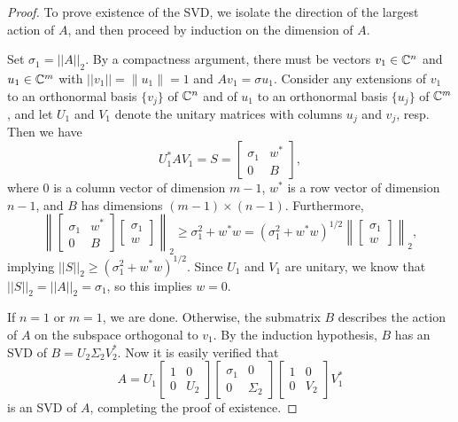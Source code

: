\begin{proof}
To prove existence of the SVD, we isolate the direction of the largest action of $A$, and then proceed by induction on the dimension of $A$.  

Set $\sigma_1=||A||_2$.  By a compactness argument, there must be vectors $v_1\in{\mathbb C}^n$ and $u_1\in{\mathbb C}^m$ with $||v_1||=\|u_1\|=1$ and $Av_1=\sigma u_1$.  Consider any extensions of $v_1$ to an orthonormal basis $\{v_j\}$  of ${\mathbb C}^n$ and of $u_1$ to an orthonormal basis $\{u_j\}$ of ${\mathbb C}^m$, and let $U_1$ and $V_1$ denote the unitary matrices with columns $u_j$ and $v_j$, resp.  Then we have 
\begin{equation}
U_1^*AV_1=S=\begin{bmatrix}
\sigma_1 & w^*\\
0 & B
\end{bmatrix},
\end{equation}
where 0 is a column vector of dimension $m-1$, $w^*$ is a row vector of dimension $n-1$, and $B$ has dimensions $(m-1)\times (n-1)$.  Furthermore, 
\[
\left\|\begin{bmatrix}
\sigma_1 & w^*\\
0 & B
\end{bmatrix}\begin{bmatrix}
\sigma_1\\
w
\end{bmatrix}\right\|_2 \geq \sigma_1^2+w^*w=(\sigma_1^2+w^*w)^{1/2}\left\|\begin{bmatrix}
\sigma_1\\
w
\end{bmatrix}\right\|_2,
\]
implying  $||S||_2\geq (\sigma_1^2+w^*w)^{1/2}.$  Since $U_1$ and $V_1$ are unitary, we know that $||S||_2=||A||_2=\sigma_1$, so this implies $w=0$.  

If $n=1$ or $m=1$, we are done.  Otherwise, the submatrix $B$ describes the action of $A$ on the subspace orthogonal to $v_1$.  By the induction hypothesis, $B$ has an SVD of $B=U_2\Sigma_2 V_2^*.$ Now it is easily verified that 
\[
A=U_1\begin{bmatrix}
1 & 0 \\ 0 & U_2
\end{bmatrix}\begin{bmatrix}
\sigma_1 & 0 \\ 0 & \Sigma_2
\end{bmatrix}\begin{bmatrix}
1 & 0 \\ 0 & V_2
\end{bmatrix}V_1^*
\]
is an SVD of $A$, completing the proof of existence.


\end{proof}
